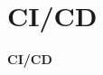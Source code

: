 \section{CI/CD}\label{sec:ci-cd}
\begin{frame}[c]
    \centering
    \Large
    \textbf{CI/CD}
\end{frame}
